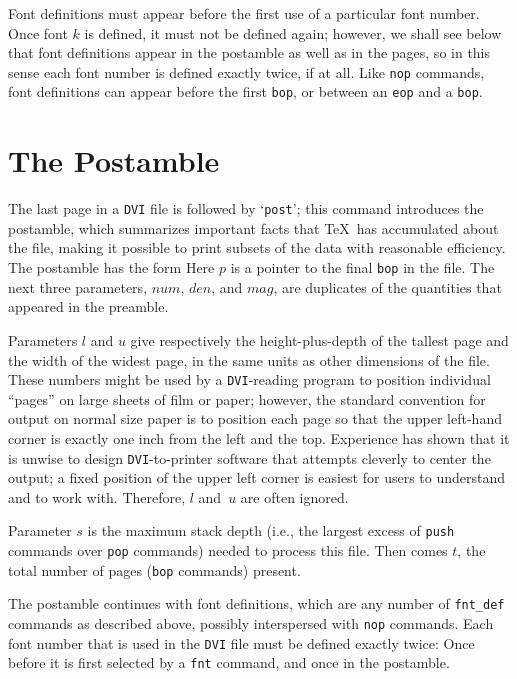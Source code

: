 \documentclass[10pt, a4paper, english]{article}
\begin{document}
Font definitions must appear before the first use of a particular font number.
Once font $k$ is defined, it must not be defined again; 
however, we shall see below 
that font definitions appear in the postamble as well as in the pages, 
so in this sense each font number is defined exactly twice, if at all. 
Like \texttt{nop} commands, 
font definitions can appear before the first \texttt{bop}, 
or between an \texttt{eop} and a \texttt{bop}. 

\section{The Postamble}\label{sec:postamble}

The last page in a \texttt{DVI} file is followed by `\texttt{post}'; 
this command introduces the postamble, 
which summarizes important facts that \TeX\ has accumulated about the file, 
making it possible to print subsets of the data with reasonable efficiency. 
The postamble has the form
Here $p$ is a pointer to the final \texttt{bop} in the file. The next three
parameters, $num$, $den$, and $mag$, are duplicates of the quantities that
appeared in the preamble.

Parameters $l$ and $u$ give respectively the height-plus-depth of the tallest
page and the width of the widest page, in the same units as other dimensions
of the file. These numbers might be used by a \texttt{DVI}-reading program to
position individual ``pages'' on large sheets of film or paper; however,
the standard convention for output on normal size paper is to position each
page so that the upper left-hand corner is exactly one inch from the left
and the top. 
Experience has shown that it is unwise to design \texttt{DVI}-to-printer
software that attempts cleverly to center the output; a fixed position of
the upper left corner is easiest for users to understand and to work with.
Therefore, $l$ and~$u$ are often ignored.

Parameter $s$ is the maximum stack depth 
(i.e., 
the largest excess of \texttt{push} commands over \texttt{pop} commands)
 needed to process this file. 
Then comes $t$, the total number of pages (\texttt{bop} commands) present.

The postamble continues with font definitions, 
which are any number of \texttt{fnt\_def} commands as described above, 
possibly interspersed with \texttt{nop} commands. 
Each font number that is used in the \texttt{DVI} file must be defined
exactly twice: Once before it is first selected by a \texttt{fnt} command, 
and once in the postamble.
\end{document}
